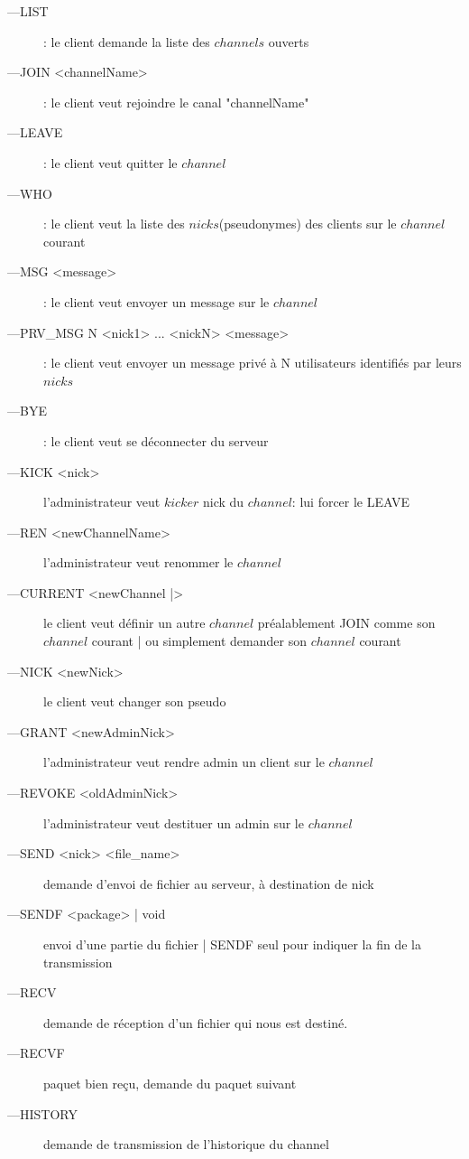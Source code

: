 \documentclass[12pt]{article}
\begin{document}
\begin{description}
    \item[---LIST]: le client demande la liste des $channels$ ouverts
    \item[---JOIN <channelName>]: le client veut rejoindre le canal "channelName" 
    \item[---LEAVE]: le client veut quitter le $channel$
    \item[---WHO] : le client veut la liste des $nicks$(pseudonymes) des clients
    sur le $channel$ courant
    \item[---MSG <message>]: le client veut envoyer un message sur le $channel$
    \item[---PRV\_MSG N <nick1> ... <nickN> <message>]: le client veut
         envoyer un message privé à N utilisateurs identifiés par leurs $nicks$
    \item[---BYE]: le client veut se déconnecter du serveur
    \item[---KICK <nick>]  l'administrateur veut $kicker$ nick
    du $channel$: lui forcer le LEAVE
    \item[---REN <newChannelName>]  l'administrateur veut renommer le $channel$
    \item[---CURRENT <newChannel |>]  le client veut définir un autre
    $channel$ préalablement JOIN comme son $channel$ courant | ou simplement
    demander son $channel$ courant
    \item[---NICK <newNick>]  le client veut changer son pseudo
    \item[---GRANT <newAdminNick>]  l'administrateur veut rendre admin
                                                un client sur le $channel$ 
    \item[---REVOKE <oldAdminNick>]  l'administrateur veut destituer 
                                            un admin sur le $channel$
    \item[---SEND <nick> <file\_name>]  demande d'envoi de fichier au serveur, à destination de nick
    \item[---SENDF <package> | void ]  envoi d'une partie du fichier | SENDF seul pour indiquer la fin de la transmission
    \item[---RECV]  demande de réception d'un fichier qui nous est destiné.
    \item[---RECVF]  paquet bien reçu, demande du paquet suivant
    \item[---HISTORY]  demande de transmission de l'historique du channel
    \\
\end{description}
\end{document}
